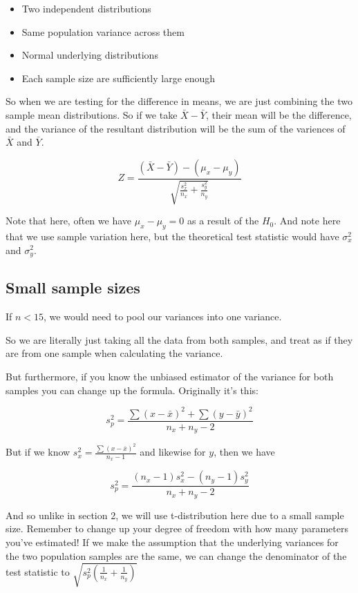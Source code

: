\documentclass{article}
\theoremstyle{mytheoremstyle}
\theoremstyle{mytheoremstyle}
\theoremstyle{myproblemstyle}
\begin{document}
    \begin{itemize}
        \item Two independent distributions
        \item Same population variance across them
        \item Normal underlying distributions
        \item Each sample size are sufficiently large enough
    \end{itemize}

    So when we are testing for the difference in means, we are just combining the two sample mean distributions. So if we take $\bar{X} - \bar{Y}$, their mean will be the difference, and the variance of the resultant distribution will be the sum of the variences of $\bar{X}$ and $\bar{Y}$. 

    \begin{definition}[Z Value]

        \[Z = \frac{(\bar{X} - \bar{Y}) - (\mu_x - \mu_y)}{\sqrt{\frac{s_x^2}{n_x} + \frac{s_y^2}{n_y}}}\]
        
    \end{definition}

    Note that here, often we have $\mu_x - \mu_y = 0$ as a result of the $H_0$. And note here that we use sample variation here, but the theoretical test statistic would have $\sigma_x^2$ and $\sigma_y^2$.


    \subsection{Small sample sizes}
    If $n < 15$, we would need to pool our variances into one variance. 

    So we are literally just taking all the data from both samples, and treat as if they are from one sample when calculating the variance. 

    But furthermore, if you know the unbiased estimator of the variance for both samples you can change up the formula. Originally it's this: 

    \[s_p^2 = \frac{\sum(x - \bar{x})^2 + \sum(y - \bar{y})^2}{n_x + n_y - 2}\]

    But if we know $s_x^2 = \frac{\sum(x - \bar{x})^2}{n_x - 1}$ and likewise for $y$, then we have

    \[s_p^2 = \frac{(n_x-1)s_x^2 - (n_y-1)s_y^2}{n_x + n_y - 2}\]

    And so unlike in section 2, we will use t-distribution here due to a small sample size. Remember to change up your degree of freedom with how many parameters you've estimated! If we make the assumption that the underlying variances for the two population samples are the same, we can change the denominator of the test statistic to $\sqrt{s_p^2 \left(\frac{1}{n_x} + \frac{1}{n_y}\right)}$
\end{document}

